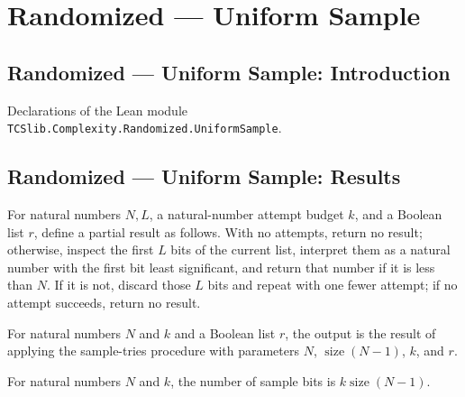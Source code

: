 \section{Randomized --- Uniform Sample}
\subsection*{Randomized --- Uniform Sample: Introduction}

Declarations of the Lean module \texttt{TCSlib.Complexity.Randomized.UniformSample}.

\subsection*{Randomized --- Uniform Sample: Results}

\begin{definition}
\label{Randomized.sampleTries}
\leanok
{}
For natural numbers $N,L$, a natural-number attempt budget $k$, and a Boolean list $r$,
define a partial result as follows. With no attempts, return no result; otherwise,
inspect the first $L$ bits of the current list, interpret them as a natural number with
the first bit least significant, and return that number if it is less than $N$. If it is
not, discard those $L$ bits and repeat with one fewer attempt; if no attempt succeeds,
return no result.
\end{definition}

\begin{definition}
\label{Randomized.uniformSample}
\leanok
{}
For natural numbers $N$ and $k$ and a Boolean list $r$, the output is the result of
applying the sample-tries procedure with parameters $N$, $\operatorname{size}(N-1)$,
$k$, and $r$.
\end{definition}

\begin{definition}
\label{Randomized.sampleCoins}
\leanok
For natural numbers $N$ and $k$, the number of sample bits is
$k\operatorname{size}(N-1)$.
\end{definition}

